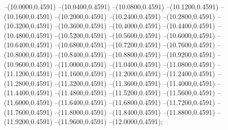 {	--(10.0000,0.4591)
	--(10.0400,0.4591)
	--(10.0800,0.4591)
	--(10.1200,0.4591)
	--(10.1600,0.4591)
	--(10.2000,0.4591)
	--(10.2400,0.4591)
	--(10.2800,0.4591)
	--(10.3200,0.4591)
	--(10.3600,0.4591)
	--(10.4000,0.4591)
	--(10.4400,0.4591)
	--(10.4800,0.4591)
	--(10.5200,0.4591)
	--(10.5600,0.4591)
	--(10.6000,0.4591)
	--(10.6400,0.4591)
	--(10.6800,0.4591)
	--(10.7200,0.4591)
	--(10.7600,0.4591)
	--(10.8000,0.4591)
	--(10.8400,0.4591)
	--(10.8800,0.4591)
	--(10.9200,0.4591)
	--(10.9600,0.4591)
	--(11.0000,0.4591)
	--(11.0400,0.4591)
	--(11.0800,0.4591)
	--(11.1200,0.4591)
	--(11.1600,0.4591)
	--(11.2000,0.4591)
	--(11.2400,0.4591)
	--(11.2800,0.4591)
	--(11.3200,0.4591)
	--(11.3600,0.4591)
	--(11.4000,0.4591)
	--(11.4400,0.4591)
	--(11.4800,0.4591)
	--(11.5200,0.4591)
	--(11.5600,0.4591)
	--(11.6000,0.4591)
	--(11.6400,0.4591)
	--(11.6800,0.4591)
	--(11.7200,0.4591)
	--(11.7600,0.4591)
	--(11.8000,0.4591)
	--(11.8400,0.4591)
	--(11.8800,0.4591)
	--(11.9200,0.4591)
	--(11.9600,0.4591)
	--(12.0000,0.4591);
}
